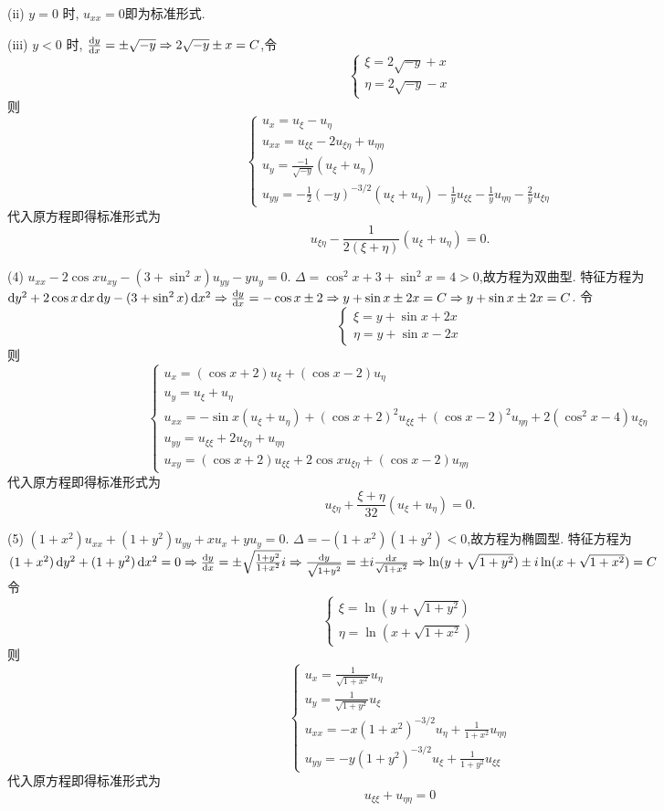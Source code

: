 \begin{solve}
  (ii) $y=0$ 时, $u_{xx}=0$即为标准形式.

  (iii) $y<0$ 时, $\frac{\mathop{}\!\mathrm{d} y}{\mathop{}\!\mathrm{d} x}=\pm\sqrt{-y}\Rightarrow 2\sqrt{-y}\pm x=C$,令
  \[\begin{cases}
  \xi=2\sqrt{-y}+x\\\eta=2\sqrt{-y}-x
  \end{cases}\]
  则
  \[\begin{cases}
  u_x=u_{\xi}-u_{\eta}\\
  u_{xx}=u_{\xi\xi}-2u_{\xi\eta}+u_{\eta\eta}\\
  u_{y}=\frac{-1}{\sqrt{-y}}(u_{\xi}+u_{\eta})\\
  u_{yy}=-\frac{1}{2}(-y)^{-3/2}(u_{\xi}+u_{\eta})-\frac{1}{y}u_{\xi\xi}-\frac{1}{y}u_{\eta\eta}-\frac{2}{y}u_{\xi\eta}
  \end{cases}\]
  代入原方程即得标准形式为
  \[u_{\xi\eta}-\frac{1}{2(\xi+\eta)}(u_{\xi}+u_{\eta}) = 0.\]

  (4) $u_{xx}-2\cos xu_{xy}-(3+\sin^2x)u_{yy}-yu_y=0$.
  $\Delta=\cos^2x+3+\sin^2x=4>0$,故方程为双曲型.
  特征方程为 $\mathop{}\!\mathrm{d} y^2+2\cos x\mathop{}\!\mathrm{d} x\mathop{}\!\mathrm{d} y-(3+\sin^2x)\mathop{}\!\mathrm{d} x^2\Rightarrow\frac{\mathop{}\!\mathrm{d} y}{\mathop{}\!\mathrm{d} x}=-\cos x\pm2\Rightarrow y+\sin x\pm2x=C\Rightarrow y+\sin x\pm 2x=C$.
  令\[\begin{cases}
  \xi=y+\sin x+2x\\\eta=y+\sin x-2x
  \end{cases}\]
  则
  \[\begin{cases}
  u_x=(\cos x+2)u_{\xi}+(\cos x-2)u_{\eta}\\
  u_y=u_{\xi}+u_{\eta}\\
  u_{xx}=-\sin x(u_{\xi}+u_{\eta})+(\cos x+2)^2u_{\xi\xi}+(\cos x-2)^2u_{\eta\eta}+2(\cos^2x-4)u_{\xi\eta}\\
  u_{yy}=u_{\xi\xi}+2u_{\xi\eta}+u_{\eta\eta}\\
  u_{xy}=(\cos x+2)u_{\xi\xi}+2\cos xu_{\xi\eta}+(\cos x-2)u_{\eta\eta}
  \end{cases}\]
  代入原方程即得标准形式为
  \[u_{\xi\eta}+\frac{\xi+\eta}{32}(u_{\xi}+u_{\eta}) = 0.\]

  (5) $(1+x^2)u_{xx}+(1+y^2)u_{yy}+xu_x+yu_y=0$.
  $\Delta=-(1+x^2)(1+y^2)<0$,故方程为椭圆型.
  特征方程为$(1+x^2)\mathop{}\!\mathrm{d} y^2+(1+y^2)\mathop{}\!\mathrm{d} x^2=0\Rightarrow\frac{\mathop{}\!\mathrm{d} y}{\mathop{}\!\mathrm{d} x}=\pm\sqrt{\frac{1+y^2}{1+x^2}}i\Rightarrow\frac{\mathop{}\!\mathrm{d} y}{\sqrt{1+y^2}}=\pm i\frac{\mathop{}\!\mathrm{d} x}{\sqrt{1+x^2}}\Rightarrow\ln(y+\sqrt{1+y^2})\pm i\ln(x+\sqrt{1+x^2})=C$\\
  令\[\begin{cases}
  \xi=\ln(y+\sqrt{1+y^2})\\\eta=\ln(x+\sqrt{1+x^2})
  \end{cases}\]
  则
  \[\begin{cases}
  u_x=\frac{1}{\sqrt{1+x^2}}u_{\eta}\\
  u_y=\frac{1}{\sqrt{1+y^2}}u_{\xi}\\
  u_{xx}=-x(1+x^2)^{-3/2}u_{\eta}+\frac{1}{1+x^2}u_{\eta\eta}\\
  u_{yy}=-y(1+y^2)^{-3/2}u_{\xi}+\frac{1}{1+y^2}u_{\xi\xi}
  \end{cases}\]
  代入原方程即得标准形式为
  \[u_{\xi\xi}+u_{\eta\eta}=0\]
\end{solve}


